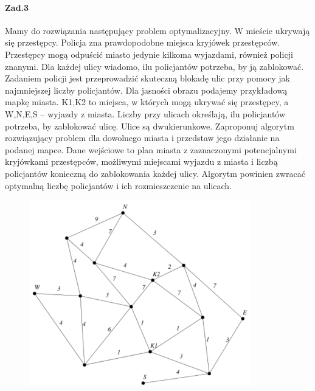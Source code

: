 \paragraph{Zad.3} Mamy do rozwiązania następujący problem optymalizacyjny. W mieście ukrywają się przestępcy. Policja zna prawdopodobne miejsca kryjówek przestępców. Przestępcy mogą odpuścić miasto jedynie kilkoma wyjazdami, również policji znanymi. Dla każdej ulicy wiadomo, ilu policjantów potrzeba, by ją zablokować. Zadaniem policji jest przeprowadzić skuteczną blokadę ulic przy pomocy jak najmniejszej liczby policjantów. Dla jasności obrazu podajemy przykładową mapkę miasta. K1,K2 to miejsca, w których mogą ukrywać się przestępcy, a W,N,E,S – wyjazdy z miasta. Liczby przy ulicach określają, ilu policjantów potrzeba, by zablokować ulicę. Ulice są dwukierunkowe. Zaproponuj algorytm rozwiązujący problem dla dowolnego miasta i przedstaw jego działanie na podanej mapce. Dane wejściowe to plan miasta z zaznaczonymi potencjalnymi kryjówkami przestępców, możliwymi miejscami wyjazdu z miasta i liczbą policjantów konieczną do zablokowania każdej ulicy. Algorytm powinien zwracać optymalną liczbę policjantów i ich rozmieszczenie na ulicach.
\begin{figure}
\centering
\includegraphics[width=.8\textwidth]{img/7_Z3}
\end{figure}


